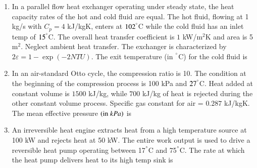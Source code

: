 \documentclass[journal]{IEEEtran}
\begin{document}
\begin{enumerate}[leftmargin=0pt]
\item In a parallel flow heat exchanger operating under steady state, the heat capacity rates of the hot and cold fluid are equal. The hot fluid, flowing at 1 kg/s with $C_p = 4$ kJ/kgK, enters at $102^\degree$C while the cold fluid has an inlet temp of $15^\degree$C. The overall heat transfer coefficient is $1$ kW/m$^2$K and area is 5 m$^2$. Neglect ambient heat transfer. The exchanger is characterized by $2\varepsilon = 1 - \exp(-2 NTU)$. The exit temperature (in $^\degree$C) for the cold fluid is
\begin{enumerate}
\hfill{}
\end{enumerate}

\item In an air-standard Otto cycle, the compression ratio is 10. The condition at the beginning of the compression process is 100 kPa and $27^\degree$C. Heat added at constant volume is $1500$ kJ/kg, while $700$ kJ/kg of heat is rejected during the other constant volume process. Specific gas constant for air = $0.287$ kJ/kgK. The mean effective pressure $\left(\text{in} \ kPa\right)$ is
\begin{enumerate}
\hfill{}
\end{enumerate}

\item An irreversible heat engine extracts heat from a high temperature source at 100 kW and rejects heat at 50 kW. The entire work output is used to drive a reversible heat pump operating between 17$^\degree$C and 75$^\degree$C. The rate  at which the heat pump delivers heat to its high temp sink is
\begin{enumerate}
\hfill{}
\end{enumerate}


\end{enumerate}
\end{document}
